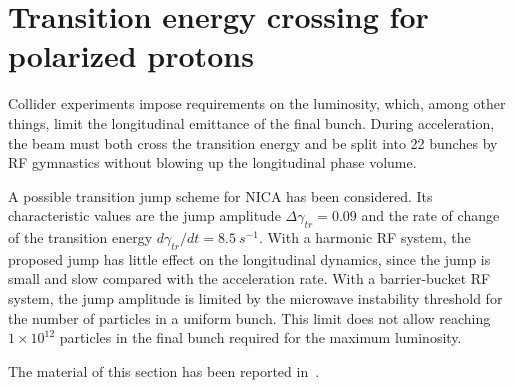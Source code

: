 \section{Transition energy crossing for polarized protons}
\label{sec:gamma-transition}


Collider experiments impose requirements on the luminosity, which, among other
things, limit the longitudinal emittance of the final bunch. During
acceleration, the beam must both cross the transition energy and be split
into 22 bunches by RF gymnastics without blowing up the longitudinal phase
volume.

A possible transition jump scheme for NICA has been considered. Its
characteristic values are the jump amplitude $\Delta\gamma_{tr} = 0.09$ and the
rate of change of the transition energy
$d\gamma_{tr}/dt = \SI{8.5}{s^{-1}}$. With a harmonic RF system, the proposed
jump has little effect on the longitudinal dynamics, since the jump is small
and slow compared with the acceleration rate. With a barrier-bucket RF system,
the jump amplitude is limited by the microwave instability threshold for the
number of particles in a uniform bunch. This limit does not allow reaching
$1\times10^{12}$ particles in the final bunch required for the maximum
luminosity.

The material of this section has been reported
in~\cite{Kolokolchikov:2024hxf,Kolokolchikov:2022akm}.
